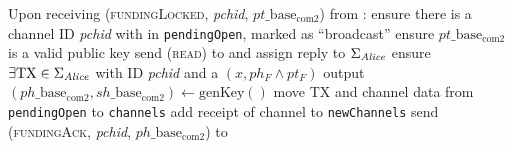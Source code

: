 \begin{algorithmic}[1]
    \State Upon receiving (\textsc{fundingLocked}, \textit{pchid},
    $pt\_\mathrm{base}_{\mathrm{com}2}$) from \bob:
    \Indent
      \State ensure there is a channel ID \textit{pchid} with \bob{} in
      \texttt{pendingOpen}, marked as ``broadcast''
      \State ensure $pt\_\mathrm{base}_{\mathrm{com}2}$ is a valid public key
      \State send (\textsc{read}) to \ledger{} and assign reply to
      $\Sigma_{\mathit{Alice}}$
      \State ensure $\exists \mathrm{TX} \in \Sigma_{\mathit{Alice}}$ with ID
      \textit{pchid} and a $\left(x, ph_F \wedge pt_F\right)$ output
      \State $\left(ph\_\mathrm{base}_{\mathrm{com}2},
      sh\_\mathrm{base}_{\mathrm{com}2}\right) \gets
      \mathrm{genKey}\left(\right)$
      \State move TX and channel data from \texttt{pendingOpen} to
      \texttt{channels}
      \State add receipt of channel to \texttt{newChannels}
      \State send (\textsc{fundingAck}, \textit{pchid},
      $ph\_\mathrm{base}_{\mathrm{com}2}$) to \bob
    \EndIndent
    \State


\end{algorithmic}
